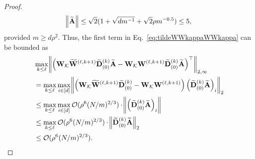 \begin{proof}
\begin{align*}
		\norm{\widetilde{\mathbf{A}}} \le  \sqrt{2}(1 + \sqrt{dm^{-1}} + \sqrt{2}\rho m^{-0.5}) \le 5,
	\end{align*}
	provided $m \ge d \rho^2$. Thus, the first term in Eq.~\ref{eq:tildeWWkappaWWkappa} can be bounded as
	\begin{align*}
		&\max_{k \le \ell} \norm{\left(\mathbf{W}_{\mathcal{K}} \widetilde{\mathbf{W}}^{(\ell, k+1)} \widetilde{\mathbf{D}}_{(0)}^{(k)} \widetilde{\mathbf{A}} - \mathbf{W}_{\mathcal{K}} \mathbf{W}^{(\ell, k+1)} \widetilde{\mathbf{D}}_{(0)}^{(k)} \widetilde{\mathbf{A}}\right)^{\top}}_{2, \infty} \\& = \max_{k \le \ell} \max_{i \in [d]} \norm{\left(\mathbf{W}_{\mathcal{K}} \widetilde{\mathbf{W}}^{(\ell, k+1)} \widetilde{\mathbf{D}}_{(0)}^{(k)}  - \mathbf{W}_{\mathcal{K}} \mathbf{W}^{(\ell, k+1)} \right) \left(\widetilde{\mathbf{D}}_{(0)}^{(k)} \widetilde{\mathbf{A}}\right)_i}_{2} \\&
		\le \max_{k \le \ell} \max_{i \in [d]} \mathcal{O}(\rho^6 (N/m)^{2/3}) \cdot \norm{ \left(\widetilde{\mathbf{D}}_{(0)}^{(k)} \widetilde{\mathbf{A}}\right)_i} \\&
		\le \max_{k \le \ell}  \mathcal{O}(\rho^6 (N/m)^{2/3}) \cdot \norm{ \widetilde{\mathbf{D}}_{(0)}^{(k)} \widetilde{\mathbf{A}}}_2 \\&
		\le \mathcal{O}(\rho^6 (N/m)^{2/3}).
	\end{align*}
	

\end{proof}
